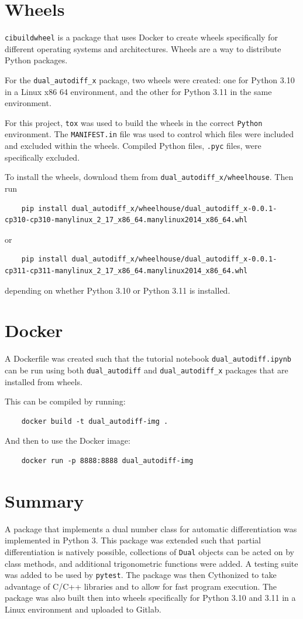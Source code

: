 \documentclass[11pt,a4paper]{article}
\begin{document}
\section{Wheels}

\texttt{cibuildwheel} \citep{cibuildwheel} is a package that uses Docker to create wheels specifically for different operating systems and architectures. Wheels are a way to distribute Python packages.

For the \texttt{dual\_autodiff\_x} package, two wheels were created: one for Python 3.10 in a Linux x86 64 environment, and the other for Python 3.11 in the same environment.

For this project, \texttt{tox} was used to build the wheels in the correct \texttt{Python} environment. The \texttt{MANIFEST.in} file was used to control which files were included and excluded within the wheels. Compiled Python files, \texttt{.pyc} files, were specifically excluded.

To install the wheels, download them from \texttt{dual\_autodiff\_x/wheelhouse}. Then run
\begin{lstlisting}
    pip install dual_autodiff_x/wheelhouse/dual_autodiff_x-0.0.1-cp310-cp310-manylinux_2_17_x86_64.manylinux2014_x86_64.whl
\end{lstlisting}
or
\begin{lstlisting}
    pip install dual_autodiff_x/wheelhouse/dual_autodiff_x-0.0.1-cp311-cp311-manylinux_2_17_x86_64.manylinux2014_x86_64.whl    
\end{lstlisting}
depending on whether Python 3.10 or Python 3.11 is installed.
\clearpage
\section{Docker}
A Dockerfile was created such that the tutorial notebook \texttt{dual\_autodiff.ipynb} can be run using both \texttt{dual\_autodiff} and \texttt{dual\_autodiff\_x} packages that are installed from wheels.

This can be compiled by running:
\begin{lstlisting}
    docker build -t dual_autodiff-img .
\end{lstlisting}
And then to use the Docker image:
\begin{lstlisting}
    docker run -p 8888:8888 dual_autodiff-img
\end{lstlisting}
\section{Summary}
A package that implements a dual number class for automatic differentiation was implemented in Python 3. This package was extended such that partial differentiation is natively possible, collections of \texttt{Dual} objects can be acted on by class methods, and additional trigonometric functions were added. A testing suite was added to be used by \texttt{pytest}. The package was then Cythonized to take advantage of C/C++ libraries and to allow for fast program execution. The package was also built then into wheels specifically for Python 3.10 and 3.11 in a Linux environment and uploaded to Gitlab.


\appendix
\end{document}
